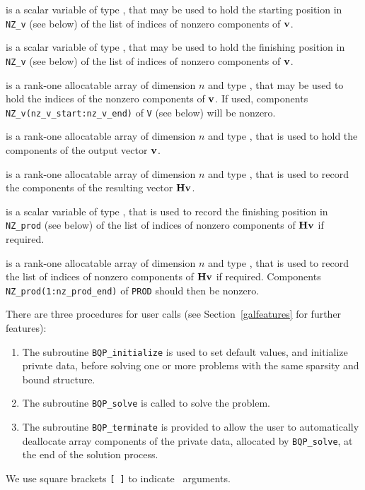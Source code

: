 \documentclass{galahad}
\newcommand{\packagename}{BQP}
\begin{document}
\begin{description}

 is a scalar variable of type \integer, that 
may be used to hold the starting position in {\tt NZ\_v} (see below) 
of the list of indices of nonzero components of ${\mathbf{v}}$.

 is a scalar variable of type \integer, that 
may be used to hold the finishing position in {\tt NZ\_v} (see below) 
of the list of indices of nonzero components of ${\mathbf{v}}$.

 is a rank-one allocatable array of dimension $n$
and type \integer, that may be used to hold the indices of the
nonzero components of ${\mathbf{v}}$. If used, components 
{\tt NZ\_v(nz\_v\_start:nz\_v\_end)} of {\tt V} (see below) will be nonzero.

 is a rank-one allocatable array of dimension $n$
and type \realdp, that is used to hold the components of the
output vector ${\mathbf{v}}$.

 is a rank-one allocatable array of dimension $n$
and type \realdp, that is used to record the components of the
resulting vector ${\mathbf{H}} {\mathbf{v}}$.

 is a scalar variable of type \integer, that 
is used to record the finishing position in {\tt NZ\_prod} (see below) 
of the list of indices of nonzero components of ${\mathbf{H}} {\mathbf{v}}$ if required.

 is a rank-one allocatable array of dimension $n$
and type \integer, that is used to record the list of
indices of nonzero components of ${\mathbf{H}} {\mathbf{v}}$ if required. Components
{\tt NZ\_prod(1:nz\_prod\_end)} of {\tt PROD} should then be nonzero.

\end{description}


\galarguments
There are three procedures for user calls
(see Section~\ref{galfeatures} for further features): 

\begin{enumerate}
\item The subroutine 
      {\tt \packagename\_initialize} 
      is used to set default values, and initialize private data, 
      before solving one or more problems with the
      same sparsity and bound structure.
\item The subroutine 
      {\tt \packagename\_solve} 
      is called to solve the problem.
\item The subroutine 
      {\tt \packagename\_terminate} 
      is provided to allow the user to automatically deallocate array 
       components of the private data, allocated by 
       {\tt \packagename\_solve}, 
       at the end of the solution process. 
\end{enumerate}
We use square brackets {\tt [ ]} to indicate \optional\ arguments.
\end{document}
